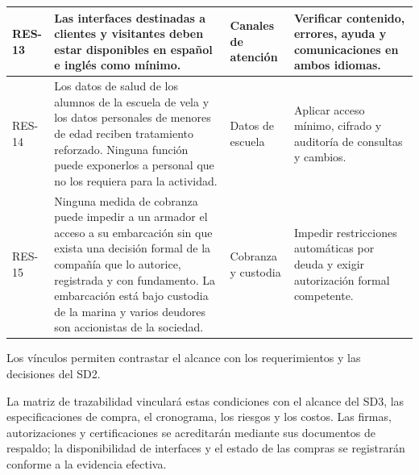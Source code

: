\begin{longtable}{|L{0.079681\AnchoTablaAnexo}|L{0.458167\AnchoTablaAnexo}|L{0.155378\AnchoTablaAnexo}|L{0.306774\AnchoTablaAnexo}|}
RES-13 & Las interfaces destinadas a clientes y visitantes deben estar disponibles en español e inglés como mínimo. & Canales de atención & Verificar contenido, errores, ayuda y comunicaciones en ambos idiomas. \\ \hline
RES-14 & Los datos de salud de los alumnos de la escuela de vela y los datos personales de menores de edad reciben tratamiento reforzado. Ninguna función puede exponerlos a personal que no los requiera para la actividad. & Datos de escuela & Aplicar acceso mínimo, cifrado y auditoría de consultas y cambios. \\ \hline
{}
RES-15 & Ninguna medida de cobranza puede impedir a un armador el acceso a su embarcación sin que exista una decisión formal de la compañía que lo autorice, registrada y con fundamento. La embarcación está bajo custodia de la marina y varios deudores son accionistas de la sociedad. & Cobranza y custodia & Impedir restricciones automáticas por deuda y exigir autorización formal competente. \\ \hline
\end{longtable}

Los vínculos permiten contrastar el alcance con los requerimientos y las decisiones del SD2.

La matriz de trazabilidad vinculará estas condiciones con el alcance del SD3, las especificaciones de compra, el cronograma, los riesgos y los costos. Las firmas, autorizaciones y certificaciones se acreditarán mediante sus documentos de respaldo; la disponibilidad de interfaces y el estado de las compras se registrarán conforme a la evidencia efectiva.
